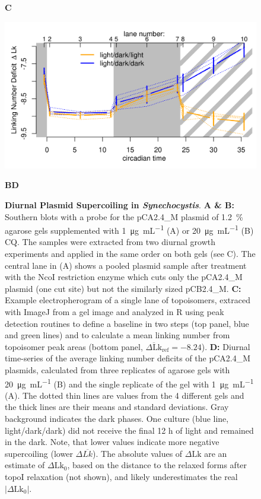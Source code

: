 \documentclass[10pt,a4]{article}
\newcommand{\ugml}{\micro\gram\per\milli\liter}
\newcommand{\scyst}{\textit{Synechocystis}}
\newcommand{\dlk}{\ensuremath{\Delta\text{Lk}}}
\newcommand{\dlkr}{\ensuremath{\Delta\text{Lk}_0}}
\begin{document}
\begin{figure}[ht!]
\begin{minipage}{.45\textwidth}
    \vspace{-.45cm}
    \textbf{C}
    
    \includegraphics[width=\textwidth]{figures/diurnal/linkingNumbers.png}
  \end{minipage}
  
  \vspace{-.5cm}
  \textbf{B}\hspace{.48\textwidth}\textbf{D}
  \vspace{.2cm}
  
  \caption{\textbf{Diurnal Plasmid Supercoiling in
      \scyst{}}. \textbf{A \& B:} Southern blots with a probe for the
    pCA2.4\_M plasmid of \SI{1.2}{\percent} agarose gels supplemented
    with \SI{1}{\ugml} (A) or \SI{20}{\ugml} (B) CQ. The samples were
    extracted from two diurnal growth experiments and applied in the
    same order on both gels (see C). The central lane in (A) shows a
    pooled plasmid sample after treatment with the NcoI restriction
    enzyme which cuts only the pCA2.4\_M plasmid (one cut site) but
    not the similarly sized pCB2.4\_M. \textbf{C:} Example
    electropherogram of a single lane of topoisomers, extraced with
    ImageJ from a gel image and analyzed in R using peak detection
    routines to define a baseline in two steps (top panel, blue and
    green lines) and to calculate a mean linking number from
    topoisomer peak areas (bottom panel,
    $\overline{\dlk}_\text{ref}=-8.24$).  \textbf{D:} Diurnal
    time-series of the average linking number deficits of the
    pCA2.4\_M plasmids, calculated from three replicates of agarose
    gels with \SI{20}{\ugml} (B) and the single replicate of the gel
    with \SI{1}{\ugml} (A).  The dotted thin lines are values from the
    4 different gels and the thick lines are their means and standard
    deviations.  Gray background indicates the dark phases. One
    culture (blue line, light/dark/dark) did not receive the final 12
    h of light and remained in the dark.  Note, that lower values
    indicate more negative supercoiling (lower $\Delta
    \overline{Lk}$). The absolute values of $\dlk$ are an estimate of
    $\dlkr$, based on the distance to the relaxed forms after topoI
    relaxation (not shown), and likely underestimates the real
    $|\dlkr|$.}
    \label{fig:blot} 
\end{figure}
\end{document}
